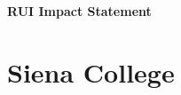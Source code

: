 \documentclass[11pt, preprint]{aastex}
\begin{document}
{\Large{\bf RUI Impact Statement}}
\vspace*{2mm}

%

\section{Siena College}
\end{document}
